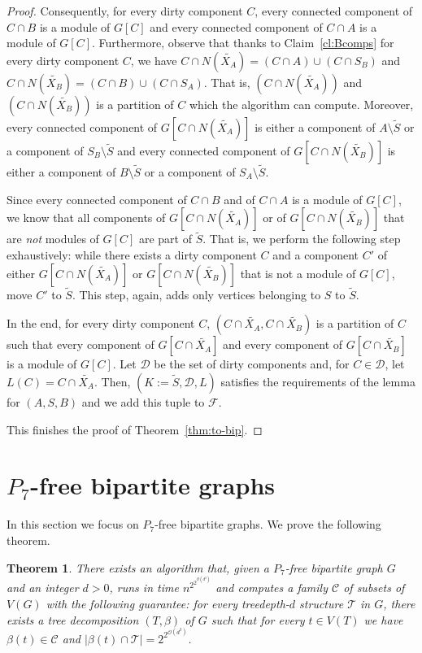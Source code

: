 \documentclass[11pt,a4paper]{article}
\newtheorem{theorem}{Theorem}[section]
\theoremstyle{definition}
\newcommand{\Oh}{\mathcal{O}}
\def\T{\mathcal{T}}
\begin{document}
\begin{proof}
Consequently, for every dirty component $C$, every connected component
of $C \cap B$ is a module of $G[C]$ and every connected component of $C \cap A$ is a module of $G[C]$. 
Furthermore, observe that thanks to Claim~\ref{cl:Bcomps} for every dirty component $C$, 
we have $C \cap N(\widetilde{X_A}) = (C \cap A) \cup (C \cap S_B)$
and $C \cap N(\widetilde{X_B}) = (C \cap B) \cup (C \cap S_A)$.
That is, $(C \cap N(\widetilde{X_A}))$ and $(C \cap N(\widetilde{X_B}))$ 
is a partition of $C$ which the algorithm can compute.
Moreover, every connected component of $G[C \cap N(\widetilde{X_A})]$ is either
a component of $A \setminus \widetilde{S}$ or a component of $S_B \setminus \widetilde{S}$
and every connected component of $G[C \cap N(\widetilde{X_B})]$ is either
a component of $B \setminus \widetilde{S}$ or a component of $S_A \setminus \widetilde{S}$.

Since every connected component of $C \cap B$ and of $C \cap A$ is a module of $G[C]$, 
we know that all components of $G[C \cap N(\widetilde{X_A})]$
or of $G[C \cap N(\widetilde{X_B})]$ that are \emph{not} modules of $G[C]$ are part of 
$\widetilde{S}$. That is, we perform the following step exhaustively:
while there exists a dirty component $C$ and a component $C'$ of either
$G[C \cap N(\widetilde{X_A})]$ or $G[C \cap N(\widetilde{X_B})]$ that is not 
a module of $G[C]$, move $C'$ to $\widetilde{S}$. 
This step, again, adds only vertices belonging to $S$ to $\widetilde{S}$.

In the end, for every dirty component $C$,
$(C \cap \widetilde{X_A},C \cap \widetilde{X_B})$ is a partition of $C$ such that
every component of $G[C \cap \widetilde{X_A}]$ and every component of $G[C \cap \widetilde{X_B}]$
is a module of $G[C]$. 
Let $\mathcal{D}$ be the set of dirty components and, for $C \in \mathcal{D}$, let $L(C) = C \cap \widetilde{X_A}$. Then, $(K := \widetilde{S}, \mathcal{D}, L)$ satisfies the
requirements of the lemma for $(A,S,B)$ and we add this tuple to $\mathcal{F}$. 

This finishes the proof of Theorem~\ref{thm:to-bip}.
\end{proof}

\section{$P_7$-free bipartite graphs}\label{sec:bipartite}
In this section we focus on $P_7$-free bipartite graphs. 
We prove the following theorem.
\begin{theorem}\label{thm:bip}
There exists an algorithm that, given a $P_7$-free bipartite graph $G$ and an integer $d > 0$,
runs in time $n^{2^{2^{\Oh(d^3)}}}$ and computes a family $\mathcal{C}$ of subsets
of $V(G)$ with the following guarantee: 
for every treedepth-$d$ structure $\T$ in $G$, there exists
a tree decomposition $(T,\beta)$ of $G$ such that
for every $t \in V(T)$ we have $\beta(t) \in \mathcal{C}$ and 
$|\beta(t) \cap \T| = 2^{2^{\Oh(d^3)}}$. 
\end{theorem}
\end{document}
